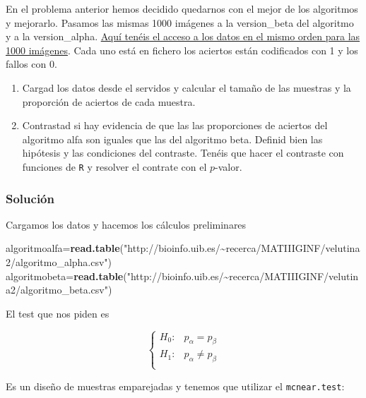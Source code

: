 \documentclass[
]{article}
\newenvironment{Shaded}{\begin{snugshade}}{\end{snugshade}}
\newcommand{\KeywordTok}[1]{\textcolor[rgb]{0.13,0.29,0.53}{\textbf{#1}}}
\newcommand{\NormalTok}[1]{#1}
\newcommand{\StringTok}[1]{\textcolor[rgb]{0.31,0.60,0.02}{#1}}
\providecommand{\tightlist}{%
  \setlength{\itemsep}{0pt}\setlength{\parskip}{0pt}}
\begin{document}
En el problema anterior hemos decidido quedarnos con el mejor de los
algoritmos y mejorarlo. Pasamos las mismas 1000 imágenes a la
version\_beta del algoritmo y a la version\_alpha.
\href{http://bioinfo.uib.es/~recerca/MATIIIGINF/velutina2}{Aquí tenéis
el acceso a los datos en el mismo orden para las 1000 imágenes}. Cada
uno está en fichero los aciertos están codificados con 1 y los fallos
con 0.

\begin{enumerate}
\def\labelenumi{\arabic{enumi}.}
\tightlist
\item
  Cargad los datos desde el servidos y calcular el tamaño de las
  muestras y la proporción de aciertos de cada muestra.
\item
  Contrastad si hay evidencia de que las las proporciones de aciertos
  del algoritmo alfa son iguales que las del algoritmo beta. Definid
  bien las hipótesis y las condiciones del contraste. Tenéis que hacer
  el contraste con funciones de \texttt{R} y resolver el contrate con el
  \(p\)-valor.
\end{enumerate}

\hypertarget{soluciuxf3n-8}{%
\subsubsection{Solución}\label{soluciuxf3n-8}}

Cargamos los datos y hacemos los cálculos preliminares

\begin{Shaded}
\begin{Highlighting}[]
\NormalTok{algoritmoalfa=}\KeywordTok{read.table}\NormalTok{(}\StringTok{"http://bioinfo.uib.es/\textasciitilde{}recerca/MATIIIGINF/velutina2/algoritmo\_alpha.csv"}\NormalTok{)}
\NormalTok{algoritmobeta=}\KeywordTok{read.table}\NormalTok{(}\StringTok{"http://bioinfo.uib.es/\textasciitilde{}recerca/MATIIIGINF/velutina2/algoritmo\_beta.csv"}\NormalTok{)}
\end{Highlighting}
\end{Shaded}

El test que nos piden es

\[
\left\{
\begin{array}{ll}
H_0: & p_{\alpha}=p_{\beta}\\
H_1: & p_{\alpha}\not=p_{\beta}\\
\end{array}
\right.
\]

Es un diseño de muestras emparejadas y tenemos que utilizar el
\texttt{mcnear.test}:
\end{document}

